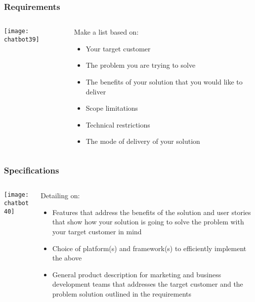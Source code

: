 \begin{frame}[fragile]\frametitle{Requirements}
    \begin{columns}
    \begin{column}[t]{0.5\linewidth}
\begin{center}
\texttt{[image: chatbot39]}
\end{center}
\end{column}
    \begin{column}[t]{0.5\linewidth}
Make a list based on:
\begin{itemize}
\item Your target customer
\item The problem you are trying to solve
\item The benefits of your solution that you would like to deliver
\item Scope limitations
\item Technical restrictions
\item The mode of delivery of your solution
\end{itemize}
\end{column}
\end{columns}
\end{frame}

\begin{frame}[fragile]\frametitle{Specifications}
    \begin{columns}
    \begin{column}[t]{0.5\linewidth}
\begin{center}
\texttt{[image: chatbot40]}
\end{center}


\end{column}
    \begin{column}[t]{0.5\linewidth}
Detailing on:
\begin{itemize}
\item Features that address the benefits of the solution and user stories that show how your solution is going to solve the problem with your target customer in mind
\item Choice of platform(s) and framework(s) to efficiently implement the above
\item General product description for marketing and business development teams that addresses the target customer and the problem solution outlined in the requirements

\end{itemize}
\end{column}
\end{columns}
\end{frame}

